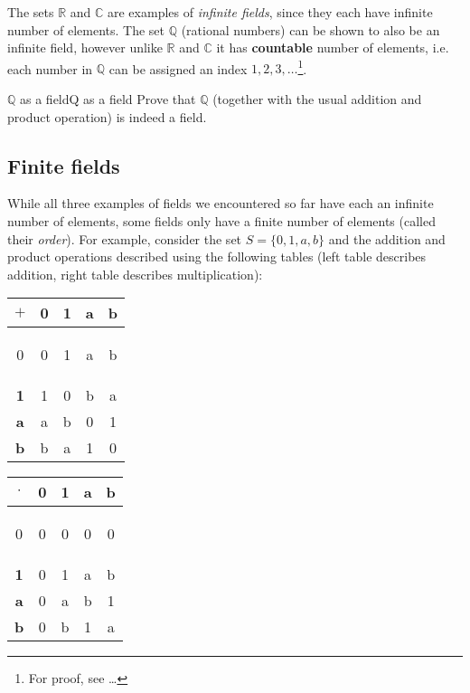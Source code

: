 The sets $\mathbb{R}$ and $\mathbb{C}$ are examples of \emph{infinite fields}, since they each have infinite number of elements. The set $\mathbb{Q}$ (rational numbers) can be shown to also be an infinite field, however unlike $\mathbb{R}$ and $\mathbb{C}$ it has \textbf{countable} number of elements, i.e. each number in $\mathbb{Q}$ can be assigned an index $1,2,3,\dots$\footnote{For proof, see \ldots}.

\begin{challange}{$\bm{\mathbb{Q}}$ as a field}{Q as a field}
	Prove that $\mathbb{Q}$ (together with the usual addition and product operation) is indeed a field.
\end{challange}

\subsection{Finite fields}
While all three examples of fields we encountered so far have each an infinite number of elements, some fields only have a finite number of elements (called their \emph{order}). For example, consider the set $S=\{0,1,a,b\}$ and the addition and product operations described using the following tables (left table describes addition, right table describes multiplication):

\centering
\begin{tabular}[]{>{\bfseries}c|cccc}
	\rowstyle{\bfseries} %
	$\bm{+}$ & 0 & 1 & a & b\\
	\hline
	\rule{0em}{2.65ex}%
	0 & 0 & 1 & a & b\\
	1 & 1 & 0 & b & a\\
	a & a & b & 0 & 1\\
	b & b & a & 1 & 0\\
\end{tabular}\hspace{2cm}
\begin{tabular}[]{>{\bfseries}c|cccc}
	\rowstyle{\bfseries}
	$\bm{\cdot}$ & 0 & 1 & a & b\\
	\hline
	\rule{0em}{2.65ex}%
	0 & 0 & 0 & 0 & 0\\
	1 & 0 & 1 & a & b\\
	a & 0 & a & b & 1\\
	b & 0 & b & 1 & a\\
\end{tabular}

